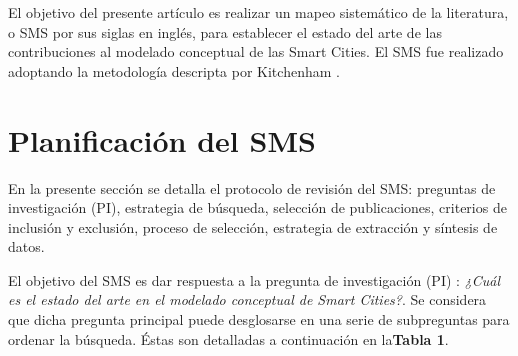 \documentclass[runningheads,a4paper,spanish]{llncs}
\begin{document}




El objetivo del presente artículo es realizar un mapeo sistemático de la
literatura, o SMS por sus siglas en inglés, para establecer el estado del arte
de las contribuciones al modelado conceptual de las Smart Cities. El SMS fue
realizado adoptando la metodología descripta por Kitchenham
\cite{kitchenham_guidelines_2007}.



%

\section{Planificación del SMS}\label{metodo}

En la presente sección se detalla el protocolo de revisión del SMS:
preguntas de investigación (PI), estrategia de búsqueda, selección de
publicaciones, criterios de inclusión y exclusión, proceso de selección,
estrategia de extracción y síntesis de datos.

El objetivo del SMS es dar respuesta a la pregunta de investigación (PI) :
\textit{¿Cuál es el estado del arte en el modelado conceptual de Smart
Cities?}. Se considera que dicha pregunta principal puede desglosarse en una
serie de subpreguntas para ordenar la búsqueda. Éstas son detalladas a
continuación en la\textbf{Tabla 1}.
\end{document}
